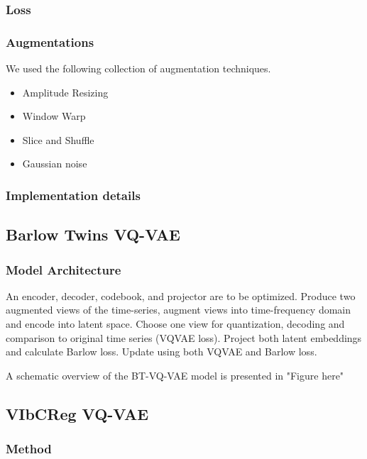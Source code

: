 \documentclass[../../thesis.tex]{subfiles}
\begin{document}
\subsubsection{Loss}


\subsubsection{Augmentations}
We used the following collection of augmentation techniques.
\begin{itemize}
    \item Amplitude Resizing
    \item Window Warp
    \item Slice and Shuffle
    \item Gaussian noise
\end{itemize}

\subsubsection{Implementation details}

\subsection{Barlow Twins VQ-VAE}
\subsubsection{Model Architecture}


An encoder, decoder, codebook, and projector are to be optimized. Produce two augmented views of the time-series, augment views into time-frequency domain and encode into latent space. Choose one view for quantization, decoding and comparison to original time series (VQVAE loss). Project both latent embeddings and calculate Barlow loss. Update using both VQVAE and Barlow loss.

A schematic overview of the BT-VQ-VAE model is presented in "Figure here"



\subsection{VIbCReg VQ-VAE}

\subsubsection{Method}
\end{document}
